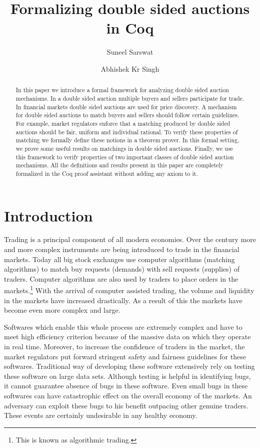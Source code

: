 \documentclass[a4paper,UKenglish,cleveref, autoref]{lipics-v2019}
\title{Formalizing double sided auctions in Coq} %
\author{Suneel Sarswat}{Tata Institute of Fundamental Research, India} {suneel.sarswat@gmail.com}
{}{}
\author{Abhishek Kr Singh}{Tata Institute of Fundamental Research, India} {abhishek.uor@gmail.com}
{}{}
\begin{document}
\newcommand{\tw}{\texttt}

\maketitle

\begin{abstract}


In this paper we introduce a formal framework for analyzing double sided auction mechanisms. In a
double sided auction multiple buyers and sellers participate for trade.
In financial markets double sided auctions are used for price discovery. A mechanism for double
sided auctions to match buyers and sellers should follow certain guidelines.
For example, market regulators enforce that a matching produced by double sided auctions should 
be fair, uniform and individual rational. To verify these properties of matching we formally define these notions
in a theorem prover. 
In this formal setting, we prove some useful results on matchings in double sided
auctions. Finally, we use this framework to verify properties of two important classes of double
sided auction mechanisms. All the definitions and results present in this paper are completely formalized in
the Coq proof assistant without adding any axiom to it. 
\end{abstract}

\section{Introduction}
\label{section1}

Trading is a principal component of all modern economies. Over the century more and more complex instruments are being introduced to trade in the financial markets. Today all big stock exchanges use computer algorithms (matching algorithms) to match buy requests (demands) with sell requests (supplies) of traders. Computer algorithms are also used by  traders to place orders in the markets.\footnote{This is known as algorithmic trading.} With the arrival of computer assisted trading, the volume and liquidity in the markets have increased drastically. As a result of this the markets have become even more complex and large.  

Softwares which enable this whole process are extremely complex and have to meet high efficiency criterion because of the massive data on which they operate in real time. Moreover, to increase the confidence of traders in the market, the market regulators put forward stringent safety and fairness guidelines for these softwares. Traditional way of developing these software extensively rely on testing these software on large data sets. Although testing is helpful in identifying bugs, it cannot guarantee absence of bugs in these software.  Even small bugs in these softwares can have catastrophic effect on the overall economy of the markets. An adversary can exploit these bugs to his benefit outpacing other genuine traders.  These events are certainly undesirable in any healthy economy. 
\end{document}
